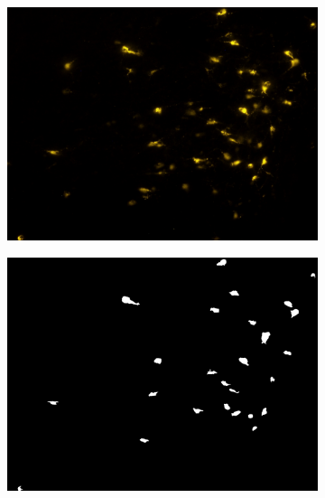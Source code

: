 \begin{figure}
\centering
\begin{subfigure}{0.5\textwidth}
\includegraphics[width=\linewidth]{figures/120_dataset/i_168.jpeg}
\subcaption{}
\end{subfigure}%
\begin{subfigure}{0.5\textwidth}
\includegraphics[width=\linewidth]{figures/120_dataset/m_168.png}
\subcaption{}
\label{fig:dataset:dark}
\end{subfigure}


\end{figure}
